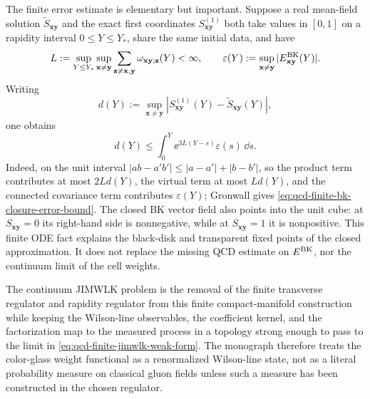 The finite error estimate is elementary but important.  Suppose a real
mean-field solution \(\widetilde S_{\mathbf x\mathbf y}\) and the exact first
coordinates \(S_{\mathbf x\mathbf y}^{(1)}\) both take values in
\([0,1]\) on a rapidity interval \(0\le Y\le Y_*\), share the same initial
data, and have
\[
  L:=\sup_{Y\le Y_*}\sup_{\mathbf x\ne\mathbf y}
  \sum_{\mathbf z\ne\mathbf x,\mathbf y}
  \omega_{\mathbf x\mathbf y;\mathbf z}(Y)<\infty ,
  \qquad
  \varepsilon(Y):=
  \sup_{\mathbf x\ne\mathbf y}
  |E_{\mathbf x\mathbf y}^{\rm BK}(Y)|.
\]
Writing
\[
  d(Y):=
  \sup_{\mathbf x\ne\mathbf y}
  |S_{\mathbf x\mathbf y}^{(1)}(Y)-\widetilde S_{\mathbf x\mathbf y}(Y)|,
\]
one obtains
\begin{equation}
  d(Y)
  \le
  \int_0^Y \ee^{3L(Y-s)}\varepsilon(s)\,\dd s.
  \label{eq:qcd-finite-bk-closure-error-bound}
\end{equation}
Indeed, on the unit interval
\(|ab-a'b'|\le |a-a'|+|b-b'|\), so the product term contributes at most
\(2Ld(Y)\), the virtual term at most \(Ld(Y)\), and the connected covariance
term contributes \(\varepsilon(Y)\); Gronwall gives
\eqref{eq:qcd-finite-bk-closure-error-bound}.  The closed BK vector field
also points into the unit cube: at \(S_{\mathbf x\mathbf y}=0\) its right-hand
side is nonnegative, while at \(S_{\mathbf x\mathbf y}=1\) it is
nonpositive.  This finite ODE fact explains the black-disk and transparent
fixed points of the closed approximation.  It does not replace the missing
QCD estimate on \(E^{\rm BK}\), nor the continuum limit of the cell weights.

The continuum JIMWLK problem is the removal of the finite transverse regulator
and rapidity regulator from this finite compact-manifold construction while
keeping the Wilson-line observables, the coefficient kernel, and the
factorization map to the measured process in a topology strong enough to pass
to the limit in \eqref{eq:qcd-finite-jimwlk-weak-form}.  The monograph
therefore treats the color-glass weight functional as a renormalized
Wilson-line state, not as a literal probability measure on classical gluon
fields unless such a measure has been constructed in the chosen regulator.

